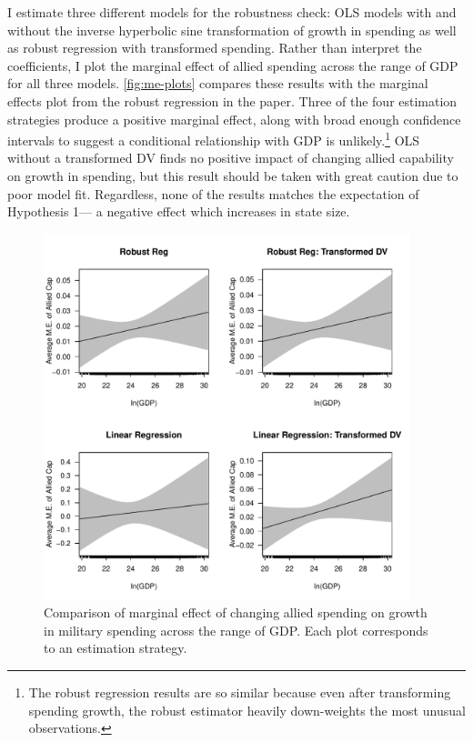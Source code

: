 \documentclass[12pt]{article}
\begin{document}
I estimate three different models for the robustness check: OLS models with and without the inverse hyperbolic sine transformation of growth in spending as well as robust regression with transformed spending. 
Rather than interpret the coefficients, I plot the marginal effect of allied spending across the range of GDP for all three models.
\autoref{fig:me-plots} compares these results with the marginal effects plot from the robust regression in the paper. 
Three of the four estimation strategies produce a positive marginal effect, along with broad enough confidence intervals to suggest a conditional relationship with GDP is unlikely.\footnote{The robust regression results are so similar because even after transforming spending growth, the robust estimator heavily down-weights the most unusual observations.} 
OLS without a transformed DV finds no positive impact of changing allied capability on growth in spending, but this result should be taken with great caution due to poor model fit. 
Regardless, none of the results matches the expectation of Hypothesis 1--- a negative effect which increases in state size. 


\begin{figure}[htbp]
	\centering
		\includegraphics[width=0.95\textwidth]{me-plots.pdf}
	\caption{Comparison of marginal effect of changing allied spending on growth in military spending across the range of GDP. Each plot corresponds to an estimation strategy.}
	\label{fig:me-plots}
\end{figure}
\end{document}
